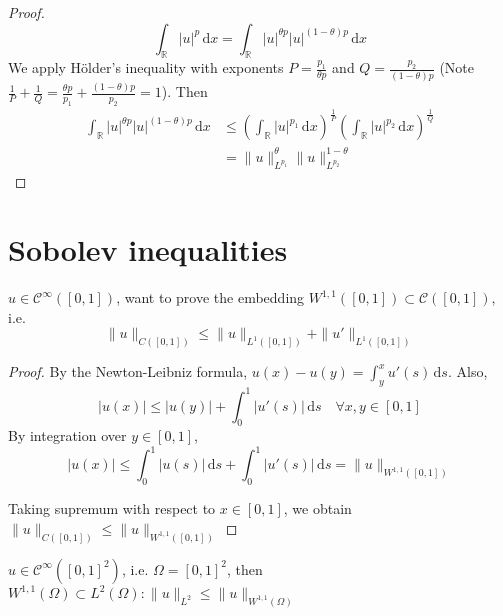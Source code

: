 \documentclass{report}
\begin{document}
\begin{proof}
    \[\int_{\mathbb{R}} \vert u \vert^p \,\mathrm{d}x = \int_{\mathbb{R}} \vert u \vert^{\theta p} \vert u \vert^{(1-\theta) p} \,\mathrm{d}x\]
    We apply Hölder's inequality with exponents \(P = \frac{p_1}{\theta p} \) and \(Q = \frac{p_2}{(1-\theta)p}\) (Note \(\frac{1}{P} + \frac{1}{Q} = \frac{\theta p}{p_1} + \frac{(1-\theta)p}{p_2} = 1\)). Then    
    \begin{align*}
        \int_{\mathbb{R}} \vert u \vert^{\theta p} \vert u \vert^{(1-\theta) p} \,\mathrm{d}x &\leq \left(\int_{\mathbb{R}} \vert u \vert^{p_1} \,\mathrm{d}x \right)^{\frac{1}{P}} \left(\int_{\mathbb{R}} \vert u \vert^{p_2} \,\mathrm{d}x \right)^{\frac{1}{Q}} \\
        &= \|u\|_{L^{p_1}}^{\theta} \|u\|_{L^{p_2}}^{1 - \theta}
    \end{align*}
\end{proof}

\section{Sobolev inequalities}
{
    \(u \in \mathcal{C}^{\infty}([0,1])\), want to prove the embedding \(W^{1, 1}([0,1]) \subset \mathcal{C}([0,1])\), i.e.
    \begin{equation}\label{eq:3}
        \|u\|_{C([0,1])} \leq \|u\|_{L^{1}([0,1])} + \|u'\|_{L^{1}([0,1])}
    \end{equation}
}

\begin{proof}
    By the Newton-Leibniz formula, \(u(x) - u(y) = \int_{y}^{x} u'(s) \,\mathrm{d}s\). Also,
    \[|u(x)| \leq |u(y)| + \int_{0}^{1} |u'(s)| \,\mathrm{d}s \quad \forall x, y \in [0,1]\]
    By integration over \(y \in [0,1]\), 
    \[|u(x)| \leq \int_{0}^{1} |u(s)| \,\mathrm{d}s + \int_{0}^{1} |u'(s)| \,\mathrm{d}s = \|u\|_{W^{1, 1}([0, 1])}\]

    Taking supremum with respect to \(x \in [0,1]\), we obtain \(\|u\|_{C([0,1])} \leq \|u\|_{W^{1, 1}([0, 1])}\)
\end{proof}

{
    \(u \in \mathcal{C}^{\infty}([0,1]^2)\),  i.e. \(\Omega = [0,1]^2\), then \(W^{1, 1}(\Omega) \subset L^{2}(\Omega) : \|u\|_{L^{2}} \leq \|u\|_{W^{1, 1}(\Omega)}\)
}
\end{document}
